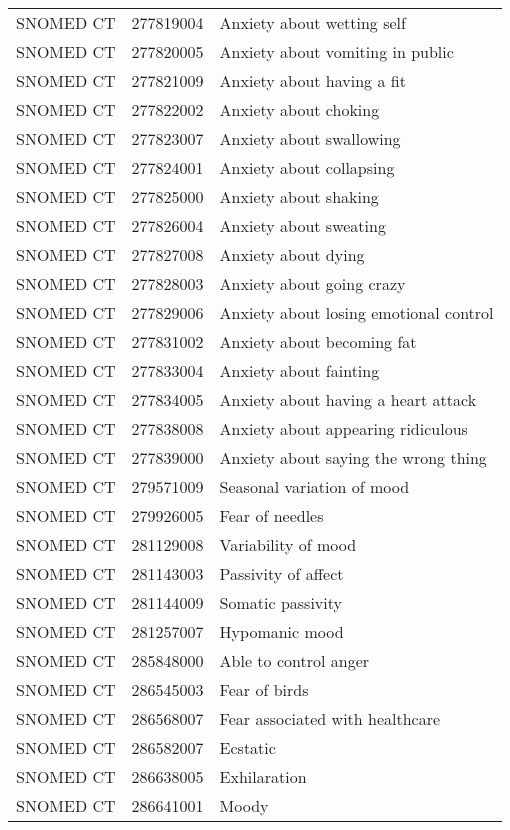 \begin{longtable}{p{}p{}p{}}
  SNOMED CT & 277819004 & Anxiety about wetting self \\ 
  SNOMED CT & 277820005 & Anxiety about vomiting in public \\ 
  SNOMED CT & 277821009 & Anxiety about having a fit \\ 
  SNOMED CT & 277822002 & Anxiety about choking \\ 
  SNOMED CT & 277823007 & Anxiety about swallowing \\ 
  SNOMED CT & 277824001 & Anxiety about collapsing \\ 
  SNOMED CT & 277825000 & Anxiety about shaking \\ 
  SNOMED CT & 277826004 & Anxiety about sweating \\ 
  SNOMED CT & 277827008 & Anxiety about dying \\ 
  SNOMED CT & 277828003 & Anxiety about going crazy \\ 
  SNOMED CT & 277829006 & Anxiety about losing emotional control \\ 
  SNOMED CT & 277831002 & Anxiety about becoming fat \\ 
  SNOMED CT & 277833004 & Anxiety about fainting \\ 
  SNOMED CT & 277834005 & Anxiety about having a heart attack \\ 
  SNOMED CT & 277838008 & Anxiety about appearing ridiculous \\ 
  SNOMED CT & 277839000 & Anxiety about saying the wrong thing \\ 
  SNOMED CT & 279571009 & Seasonal variation of mood \\ 
  SNOMED CT & 279926005 & Fear of needles \\ 
  SNOMED CT & 281129008 & Variability of mood \\ 
  SNOMED CT & 281143003 & Passivity of affect \\ 
  SNOMED CT & 281144009 & Somatic passivity \\ 
  SNOMED CT & 281257007 & Hypomanic mood \\ 
  SNOMED CT & 285848000 & Able to control anger \\ 
  SNOMED CT & 286545003 & Fear of birds \\ 
  SNOMED CT & 286568007 & Fear associated with healthcare \\ 
  SNOMED CT & 286582007 & Ecstatic \\ 
  SNOMED CT & 286638005 & Exhilaration \\ 
  SNOMED CT & 286641001 & Moody \\ 

\end{longtable}
